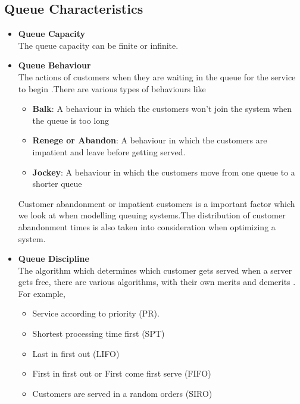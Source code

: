 \subsection{Queue Characteristics}
\begin{itemize}
\item \textbf{Queue Capacity}
\\The queue capacity can be finite or infinite.
\item \textbf{Queue Behaviour}
\\The actions of customers when they are waiting in the queue for the service to begin .There are various types of behaviours like 
\begin{itemize}
\item \textbf{Balk}: A behaviour in which the customers won't join the system when the queue is too long 
\item \textbf{Renege or Abandon}: A behaviour in which the customers are impatient and leave before getting served.
\item \textbf{Jockey}: A behaviour in which the customers move from one queue to a shorter queue
\end{itemize}
Customer abandonment or impatient customers is a important factor which we look at when modelling queuing systems.The distribution of customer abandonment times is also taken into consideration when optimizing a system.
\item \textbf{Queue Discipline}
\\The algorithm which determines which customer gets served when a server gets free, there are various algorithms, with their own merits and demerits . For example,
\begin{itemize}
\item Service according to priority (PR).
\item Shortest processing time first (SPT)
\item Last in first out (LIFO)
\item First in first out or First come first serve (FIFO)
\item Customers are served in a random orders (SIRO)
\end{itemize}
\end{itemize}
